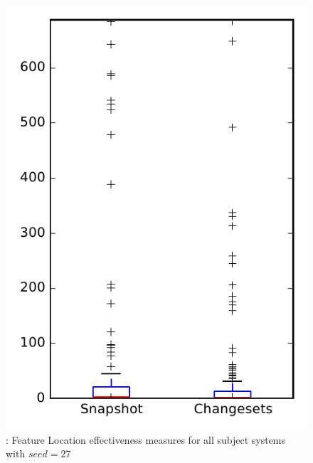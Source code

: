 
\begin{figure}
\centering
\includegraphics[height=0.4\textheight]{figures/flt_seed/rq1_overview_27}
\caption{\rone: Feature Location effectiveness measures for all subject systems with $seed=27$}
\label{fig:flt_seed:rq1:overview}
\end{figure}
